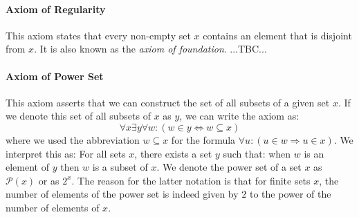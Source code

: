 
\paragraph{Axiom of Regularity}
This axiom states that every non-empty set $x$ contains an element that is disjoint from $x$. It is also known as the \emph{axiom of foundation}. ...TBC...







\paragraph{Axiom of Power Set}
This axiom asserts that we can construct the set of all subsets of a given set $x$. If we denote this set of all subsets of $x$ as $y$, we can write the axiom as:
\begin{equation}
\forall x \exists y \forall w: (w \in y \Leftrightarrow w \subseteq x)
\end{equation}
where we used the abbreviation $w \subseteq x$ for the formula $\forall u: (u \in w \Rightarrow u \in x)$. We interpret this as: For all sets $x$, there exists a set $y$ such that: when $w$ is an element of $y$ then $w$ is a subset of $x$. We denote the power set of a set $x$ as $\mathcal{P}(x)$ or as $2^x$. The reason for the latter notation is that for finite sets $x$, the number of elements of the power set is indeed given by $2$ to the power of the number of elements of $x$.

